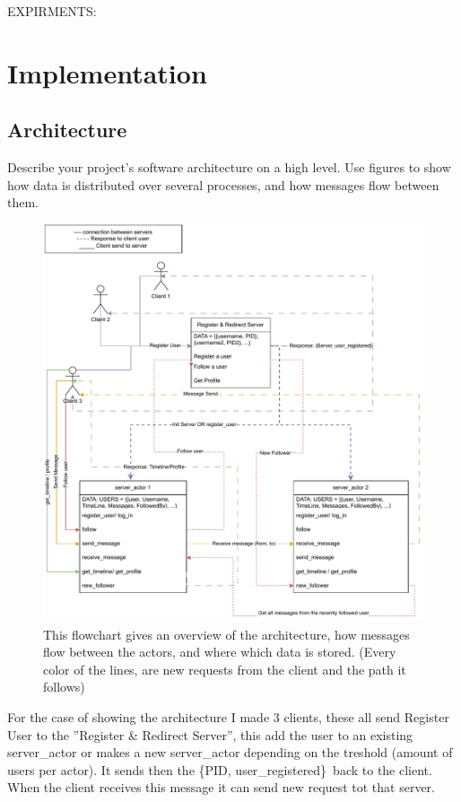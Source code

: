 \documentclass[a4paper]{article}
\begin{document}
EXPIRMENTS:

\section{Implementation}

\subsection{Architecture}

Describe your project's software architecture on a high level. Use figures to show
how data is distributed over several processes, and how messages flow between them.

\begin{figure}[H]
	\centering
	\includegraphics[width = \linewidth]{Architecture.pdf}
	\caption{
		This flowchart gives an overview of the architecture, how messages flow between the actors, and where which data is stored. (Every color of the lines, are new requests from the client and the path it follows)
	}
\end{figure}

For the case of showing the architecture I made 3 clients, these all send Register User to the ''Register \& Redirect Server'', this add the user to an existing server\_actor or makes a new server\_actor depending on the treshold (amount of users per actor).
It sends then the \{PID, user\_registered\} back to the client. When the client receives this message it can send new request tot that server. 
\end{document}
